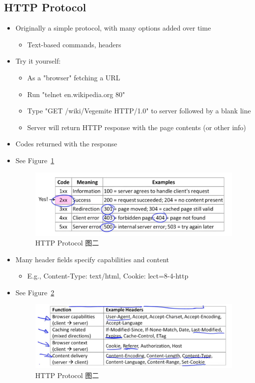\documentclass[12pt]{ctexart}   %
\begin{document}
	\subsection{HTTP Protocol}
	\begin{itemize}
		\item Originally a simple protocol, with many options added over time
		\begin{itemize}
			\item Text-based commands, headers
		\end{itemize}
		
		\item Try it yourself:
		\begin{itemize}
			\item As a "browser" fetching a URL
			\item Run "telnet en.wikipedia.org 80"
			\item Type "GET /wiki/Vegemite HTTP/1.0" to server followed by a blank line
			\item Server will return HTTP response with the page contents (or other info)
		\end{itemize}
		
		\item Codes returned with the response
		\item See Figure~\ref{fig:8-4-7}
		  
		 \begin{figure}[h!] %
		\centering
		 \includegraphics[scale=0.7]{images/8-4-7}
		\caption{ HTTP Protocol 图二 }
		 \label{fig:8-4-7}
		 \end{figure}
		 
		 \item Many header fields specify capabilities and content
		 \begin{itemize}
		 	\item E.g., Content-Type: text/html, Cookie: lect=8-4-http
		 \end{itemize}
		 \item See Figure~\ref{fig:8-4-8}
		  
		 \begin{figure}[h!] %
		\centering
		 \includegraphics[scale=0.7]{images/8-4-8}
		\caption{ HTTP Protocol 图二}
		 \label{fig:8-4-8}
		 \end{figure}
	\end{itemize}
	
\end{document}
